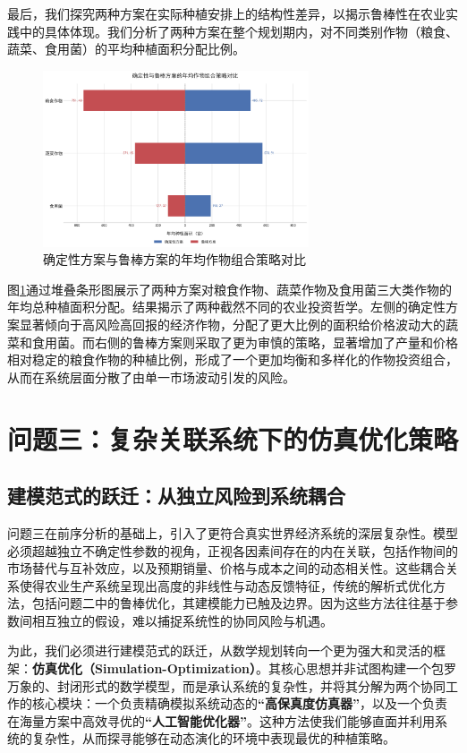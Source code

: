 \documentclass[withoutpreface,bwprint]{cumcmthesis} %
\begin{document}
最后，我们探究两种方案在实际种植安排上的结构性差异，以揭示鲁棒性在农业实践中的具体体现。我们分析了两种方案在整个规划期内，对不同类别作物（粮食、蔬菜、食用菌）的平均种植面积分配比例。

\begin{figure}[htbp]
    \centering
    \includegraphics[width=0.7\textwidth]{figures/2_2.png}
    \caption{确定性方案与鲁棒方案的年均作物组合策略对比}
    \label{fig:2_2}
\end{figure}



图\ref{fig:2_2}通过堆叠条形图展示了两种方案对粮食作物、蔬菜作物及食用菌三大类作物的年均总种植面积分配。结果揭示了两种截然不同的农业投资哲学。左侧的确定性方案显著倾向于高风险高回报的经济作物，分配了更大比例的面积给价格波动大的蔬菜和食用菌。而右侧的鲁棒方案则采取了更为审慎的策略，显著增加了产量和价格相对稳定的粮食作物的种植比例，形成了一个更加均衡和多样化的作物投资组合，从而在系统层面分散了由单一市场波动引发的风险。


\section{问题三：复杂关联系统下的仿真优化策略}

\subsection{建模范式的跃迁：从独立风险到系统耦合}

问题三在前序分析的基础上，引入了更符合真实世界经济系统的深层复杂性。模型必须超越独立不确定性参数的视角，正视各因素间存在的内在关联，包括作物间的市场替代与互补效应，以及预期销量、价格与成本之间的动态相关性。这些耦合关系使得农业生产系统呈现出高度的非线性与动态反馈特征，传统的解析式优化方法，包括问题二中的鲁棒优化，其建模能力已触及边界。因为这些方法往往基于参数间相互独立的假设，难以捕捉系统性的协同风险与机遇。

为此，我们必须进行建模范式的跃迁，从数学规划转向一个更为强大和灵活的框架：\textbf{仿真优化（Simulation-Optimization）}。其核心思想并非试图构建一个包罗万象的、封闭形式的数学模型，而是承认系统的复杂性，并将其分解为两个协同工作的核心模块：一个负责精确模拟系统动态的\textbf{“高保真度仿真器”}，以及一个负责在海量方案中高效寻优的\textbf{“人工智能优化器”}。这种方法使我们能够直面并利用系统的复杂性，从而探寻能够在动态演化的环境中表现最优的种植策略。
\end{document}
